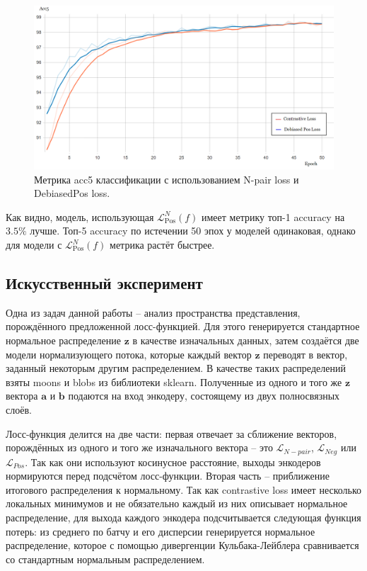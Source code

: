 \documentclass[a4paper, 14pt]{article}
\begin{document}
\begin{figure}[!ht]
    \includegraphics[scale = 0.52]{Pictures/loss_acc5.png}
    \caption{Метрика acc5 классификации с использованием N-pair loss и DebiasedPos loss.}
    \label{fg:acc5}
\end{figure}

Как видно, модель, использующая $\mathcal{L}_{\text{Pos}}^N(f)$ имеет метрику топ-1 accuracy на $3.5\%$ лучше. Топ-5 accuracy по истечении 50 эпох у моделей одинаковая, однако для модели с $\mathcal{L}_{\text{Pos}}^N(f)$ метрика растёт быстрее.

\subsection{Искусственный эксперимент}
Одна из задач данной работы -- анализ пространства представления, порождённого предложенной лосс-функцией. Для этого генерируется стандартное нормальное распределение $\mathbf{z}$ в качестве изначальных данных, затем создаётся две модели нормализующего потока, которые каждый вектор $\mathbf{z}$ переводят в вектор, заданный некоторым другим распределением. В качестве таких распределений взяты moons и blobs из библиотеки sklearn. Полученные из одного и того же $\mathbf{z}$ вектора $\mathbf{a}$ и $\mathbf{b}$ подаются на вход энкодеру, состоящему из двух полносвязных слоёв.

Лосс-функция делится на две части: первая отвечает за сближение векторов, порождённых из одного и того же изначального вектора -- это $\mathcal{L}_{N-pair}$, $\mathcal{L}_{Neg}$ или $\mathcal{L}_{Pos}$. Так как они используют косинусное расстояние, выходы энкодеров нормируются перед подсчётом лосс-функции. Вторая часть -- приближение итогового распределения к нормальному. Так как contrastive loss имеет несколько локальных минимумов и не обязательно каждый из них описывает нормальное распределение, для выхода каждого энкодера подсчитывается следующая функция потерь: из среднего по батчу и его дисперсии генерируется нормальное распределение, которое с помощью дивергенции Кульбака-Лейблера сравнивается со стандартным нормальным распределением.
\end{document}
